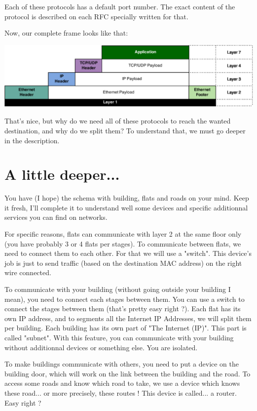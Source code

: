 \documentclass{article}
\begin{document}
	Each of these protocols has a default port number. The exact content of the protocol is described on each RFC
	specially written for that.
	
	Now, our complete frame looks like that:
	\begin{center}
	\includegraphics[scale=0.35]{content/layer7.eps}
	\end{center}
	
	That's nice, but why do we need all of these protocols to reach the wanted destination, and why do we split them?
	To understand that, we must go deeper in the description.

\section{A little deeper...}

	You have (I hope) the schema with building, flats and roads on your mind. Keep it fresh, I'll complete it to 
	understand well some devices and specific additionnal services you can find on networks.
	
	For specific reasons, flats can communicate with layer 2 at the same floor only (you have probably 3 or 4 flats
	per stages). To communicate between flats, we need to connect them to each other. For that we will use a "switch".
	This device's job is just to send traffic (based on the destination MAC address) on the right wire connected.
	
	To communicate with your building (without going outside your building I mean), you need to connect each stages between
	them. You can use a switch to connect the stages between them (that's pretty easy right ?). Each flat has its own
	IP address, and to segments all the Internet IP Addresses, we will split them per building. Each building has its own
	part of "The Internet (IP)". This part is called "subnet". With this feature, you can communicate with your building
	without additionnal devices or something else. You are isolated.
	
	To make buildings communicate with others, you need to put a device on the building door, which will work on the
	link between the building and the road. To access some roads and know which road to take, we use a device
	which knows these road... or more precisely, these routes ! This device is called... a router. Easy right ?
	
\end{document}
